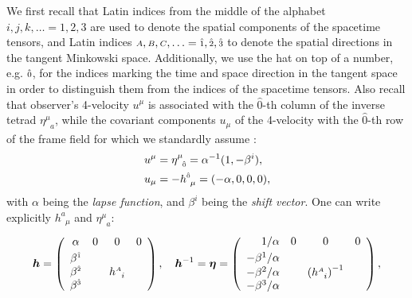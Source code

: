 \documentclass[
10pt, %
a4paper, %
oneside, %
headinclude,footinclude, %
BCOR5mm, %
]{scrartcl}
\newcommand{\sA}{\mathsmaller A}
\newcommand{\sB}{\mathsmaller B}
\newcommand{\sC}{\mathsmaller C}
\newcommand{\tetrsymbol}{h}
\newcommand{\itetrsymbol}{\eta}
\newcommand{\itetr}[2]{\itetrsymbol^{#1}_{\phantom{#1}#2}}
\newcommand{\tetr}[2]{\tetrsymbol^{#1}_{\phantom{#1}#2}}
\newcommand{\indalg}[1]{\hat{\mathsmaller{#1}}}
\newcommand{\lapse}{\alpha}
\newcommand{\shift}[1]{\beta^{#1}}
\begin{document}
We first recall that Latin indices from the middle of the alphabet $ i,j,k,\ldots=1,2,3 $ are used 
to 
denote the spatial components of the 
spacetime 
tensors, and Latin indices $ \sA,\sB,\sC,\ldots = \indalg{1},\indalg{2},\indalg{3} $ to denote the 
spatial 
directions in the tangent Minkowski space. Additionally, we use the hat on top of a number, e.g. $ 
\indalg{0} $, for the indices   marking the time and space direction in the tangent space in order 
to distinguish them 
from the indices of the spacetime tensors.  Also recall that observer's 4-velocity 
$ 
u^\mu $ is associated with the $ \hat{0} $-th column of the 
inverse tetrad $ \itetr{\mu}{a} $, while the covariant components $ u_\mu $ of the 4-velocity with 
the $ 
\hat{0} $-th row of the frame field for which we standardly assume 
\cite{Alcubierre2008,RezzollaZanottiBook}:
\begin{subequations}\label{eqn.4vel}
	\begin{align}
		u^{\mu} &= \itetr{\mu}{\indalg{0}}  = \lapse^{-1}(1,-\shift{i}), %
		\\
		u_\mu   &= - \tetr{\indalg{0}}{\mu} = (-\lapse,0,0,0),
	\end{align}
\end{subequations}
with $ \lapse $ being the \emph{lapse function}, and $ \shift{i} $ being the \emph{shift vector}. 
One can write explicitly $ \tetr{a}{\mu} $ and $ \itetr{\mu}{a} $:
\begin{equation}\label{eqn.h.eta.matrix}
	\bm{\tetrsymbol} = \left(
	\begin{array}{cccc}
		\alpha          & 0 & 0 & 0 \\[1mm]
		\beta^{\indalg{1}} &  &  &  \\
		\beta^{\indalg{2}} &  & \tetr{\sA}{i} &  \\
		\beta^{\indalg{3}} &  &  & 
	\end{array}
	\right) ,
	\quad
	\bm{h}^{-1} = \bm{\itetrsymbol} = \left(
	\begin{array}{rlcl}
		1/\alpha          & 0 & 0 & 0 \\[1mm]
		-\beta^{1}/\alpha &  &  &  \\
		-\beta^{2}/\alpha &  & \left (\tetr{\sA}{i}\right )^{-1} &  \\
		-\beta^{3}/\alpha &  &  & 
	\end{array}
	\right) ,
\end{equation}
\end{document}
